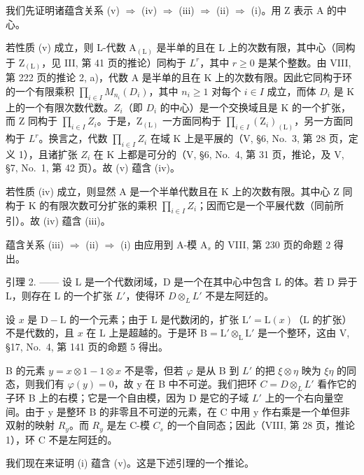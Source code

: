我们先证明诸蕴含关系 (v) \(\Rightarrow\) (iv) \(\Rightarrow\) (iii) \(\Rightarrow\) (ii) \(\Rightarrow\) (i)。用 Z 表示 A 的中心。

若性质 (v) 成立，则 L-代数 \(\mathrm{A}_{(\mathrm{L})}\) 是半单的且在 L 上的次数有限，其中心（同构于 \(\mathrm{Z}_{(\mathrm{L})}\)，见 III, 第 41 页的推论）同构于 \(L^{r}\)，其中 \(r \geqslant 0\) 是某个整数。由 VIII, 第 222 页的推论 2, a)，代数 A 是半单的且在 K 上的次数有限。因此它同构于环的一个有限乘积 \(\prod_{i \in I} M_{n_{i}}(D_{i})\)，其中 \(n_{i} \geqslant 1\) 对每个 \(i \in I\) 成立，而体 \(D_{i}\) 是 K 上的一个有限次数代数。\(Z_{i}\)（即 \(D_{i}\) 的中心）是一个交换域且是 K 的一个扩张，而 Z 同构于 \(\prod_{i \in I} Z_{i}\)。于是，\(\mathrm{Z}_{(\mathrm{L})}\) 一方面同构于 \(\prod_{i \in I} (\mathrm{Z}_{i})_{(\mathrm{L})}\)，另一方面同构于 \(L^{r}\)。换言之，代数 \(\prod_{i \in I} Z_{i}\) 在域 K 上是平展的（V, §6, No.~3, 第 28 页，定义 1），且诸扩张 \(Z_{i}\) 在 K 上都是可分的（V, §6, No.~4, 第 31 页，推论，及 V, §7, No.~1, 第 42 页）。故 (v) 蕴含 (iv)。

若性质 (iv) 成立，则显然 A 是一个半单代数且在 K 上的次数有限。其中心 Z 同构于 K 的有限次数可分扩张的乘积 \(\prod_{i\in I}Z_{i}\)；因而它是一个平展代数（同前所引）。故 (iv) 蕴含 (iii)。

蕴含关系 (iii) \(\Rightarrow\) (ii) \(\Rightarrow\) (i) 由应用到 A-模 \(\mathrm{A}_s\) 的 VIII, 第 230 页的命题 2 得出。

引理 2. —— 设 L 是一个代数闭域，D 是一个在其中心中包含 L 的体。若 D 异于 L，则存在 L 的一个扩张 \(L'\)，使得环 \(D \otimes_{L} L'\) 不是左阿廷的。

设 \(x\) 是 \(\mathrm{D} - \mathrm{L}\) 的一个元素；由于 \(\mathrm{L}\) 是代数闭的，扩张 \(\mathrm{L}' = \mathrm{L}(x)\)（\(\mathrm{L}\) 的扩张）不是代数的，且 \(x\) 在 \(\mathrm{L}\) 上是超越的。于是环 \(\mathrm{B} = \mathrm{L}' \otimes_{\mathrm{L}} \mathrm{L}'\) 是一个整环，这由 \(\mathrm{V}\), §17, No.~4, 第 141 页的命题 5 得出。

B 的元素 \(y = x \otimes 1 - 1 \otimes x\) 不是零，但若 \(\varphi\) 是从 B 到 \(L'\) 的把 \(\xi \otimes \eta\) 映为 \(\xi \eta\) 的同态，则我们有 \(\varphi(y) = 0\)，故 y 在 B 中不可逆。我们把环 \(C = D \otimes_{L} L'\) 看作它的子环 B 上的右模；它是一个自由模，因为 D 是它的子域 \(L'\) 上的一个右向量空间。由于 y 是整环 B 的非零且不可逆的元素，在 C 中用 y 作右乘是一个单但非双射的映射 \(R_y\)。而 \(R_y\) 是左 C-模 \(C_s\) 的一个自同态；因此（VIII, 第 28 页，推论 1），环 C 不是左阿廷的。

我们现在来证明 (i) 蕴含 (v)。这是下述引理的一个推论。


